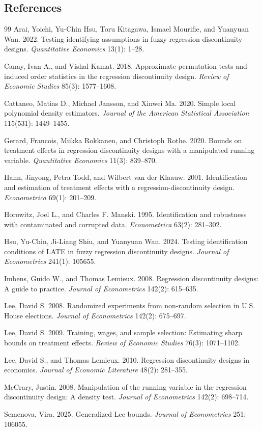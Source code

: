 \documentclass[11pt]{article}
\theoremstyle{definition}
\theoremstyle{plain}
\theoremstyle{remark}
\begin{document}
\subsection*{References}
\begin{thebibliography}{99}
Arai, Yoichi, Yu-Chin Hsu, Toru Kitagawa, Ismael Mourifie, and Yuanyuan Wan.
2022.
Testing identifying assumptions in fuzzy regression discontinuity designs.
\emph{Quantitative Economics} 13(1): 1--28.

Canay, Ivan A., and Vishal Kamat.
2018.
Approximate permutation tests and induced order statistics in the regression discontinuity design.
\emph{Review of Economic Studies} 85(3): 1577--1608.

Cattaneo, Matias D., Michael Jansson, and Xinwei Ma.
2020.
Simple local polynomial density estimators.
\emph{Journal of the American Statistical Association} 115(531): 1449--1455.

Gerard, Francois, Miikka Rokkanen, and Christoph Rothe.
2020.
Bounds on treatment effects in regression discontinuity designs with a manipulated running variable.
\emph{Quantitative Economics} 11(3): 839--870.

Hahn, Jinyong, Petra Todd, and Wilbert van der Klaauw.
2001.
Identification and estimation of treatment effects with a regression-discontinuity design.
\emph{Econometrica} 69(1): 201--209.

Horowitz, Joel L., and Charles F. Manski.
1995.
Identification and robustness with contaminated and corrupted data.
\emph{Econometrica} 63(2): 281--302.

Hsu, Yu-Chin, Ji-Liang Shiu, and Yuanyuan Wan.
2024.
Testing identification conditions of LATE in fuzzy regression discontinuity designs.
\emph{Journal of Econometrics} 241(1): 105655.

Imbens, Guido W., and Thomas Lemieux.
2008.
Regression discontinuity designs: A guide to practice.
\emph{Journal of Econometrics} 142(2): 615--635.

Lee, David S.
2008.
Randomized experiments from non-random selection in U.S. House elections.
\emph{Journal of Econometrics} 142(2): 675--697.

Lee, David S.
2009.
Training, wages, and sample selection: Estimating sharp bounds on treatment effects.
\emph{Review of Economic Studies} 76(3): 1071--1102.

Lee, David S., and Thomas Lemieux.
2010.
Regression discontinuity designs in economics.
\emph{Journal of Economic Literature} 48(2): 281--355.

McCrary, Justin.
2008.
Manipulation of the running variable in the regression discontinuity design: A density test.
\emph{Journal of Econometrics} 142(2): 698--714.

Semenova, Vira.
2025.
Generalized Lee bounds.
\emph{Journal of Econometrics} 251: 106055.
\end{thebibliography}
\end{document}
